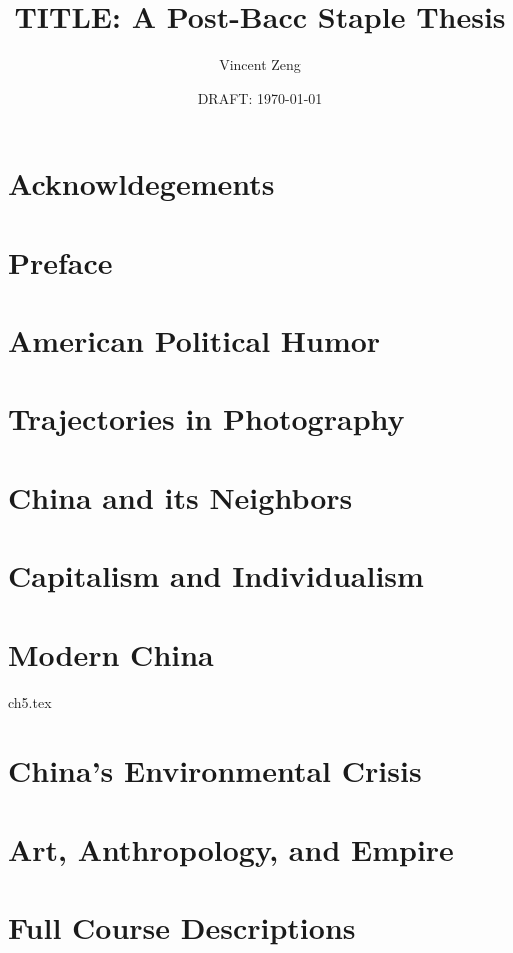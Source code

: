 \documentclass{book}[10pt]
\title{TITLE: A Post-Bacc Staple Thesis}
\author{Vincent Zeng}
\date{DRAFT: \today}
\begin{document}
\maketitle



\frontmatter
\chapter{Acknowldegements}


\tableofcontents

\chapter{Preface}



\mainmatter

\chapter{American Political Humor}


\chapter{Trajectories in Photography}


\chapter{China and its Neighbors}


\chapter{Capitalism and Individualism}


\chapter{Modern China}
 {ch5.tex}

\chapter{China's Environmental Crisis}


\chapter{Art, Anthropology, and Empire}


\appendix

\chapter{Full Course Descriptions}


\printindex
\end{document}
